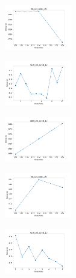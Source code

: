 \begin{figure}[H]    
    \centering
    \begin{subfigure}
        \centering
        \includegraphics[width=0.32\textwidth]{img/copkm/iris_set_const_10_949004259_time.png}
    \end{subfigure}
    \hfill
    \begin{subfigure}
        \centering
        \includegraphics[width=0.32\textwidth]{img/copkm/ecoli_set_const_10_949004259_time.png}
    \end{subfigure}
    \hfill
    \begin{subfigure}
        \centering
        \includegraphics[width=0.32\textwidth]{img/copkm/rand_set_const_10_949004259_time.png}
    \end{subfigure}
    \hfill
    \begin{subfigure}
        \centering
        \includegraphics[width=0.32\textwidth]{img/copkm/iris_set_const_10_589741062_time.png}
    \end{subfigure}
    \hfill
    \begin{subfigure}
        \centering
        \includegraphics[width=0.32\textwidth]{img/copkm/ecoli_set_const_10_589741062_time.png}

\end{subfigure}
\end{figure}

